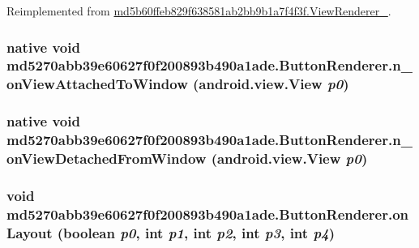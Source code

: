 Reimplemented from \hyperlink{classmd5b60ffeb829f638581ab2bb9b1a7f4f3f_1_1_view_renderer__2_40c528ea52e22dd29fa541de43c0a010}{md5b60ffeb829f638581ab2bb9b1a7f4f3f.ViewRenderer\_}.\hypertarget{classmd5270abb39e60627f0f200893b490a1ade_1_1_button_renderer_aac07254eddcd87b062e694ba6db6bb0}{
\subsubsection[{n\_\-onViewAttachedToWindow}]{\setlength{\rightskip}{0pt plus 5cm}native void md5270abb39e60627f0f200893b490a1ade.ButtonRenderer.n\_\-onViewAttachedToWindow (android.view.View {\em p0})}}
\label{classmd5270abb39e60627f0f200893b490a1ade_1_1_button_renderer_aac07254eddcd87b062e694ba6db6bb0}


\hypertarget{classmd5270abb39e60627f0f200893b490a1ade_1_1_button_renderer_8f2983bfd636ed8d8a82d46e9900e463}{
\subsubsection[{n\_\-onViewDetachedFromWindow}]{\setlength{\rightskip}{0pt plus 5cm}native void md5270abb39e60627f0f200893b490a1ade.ButtonRenderer.n\_\-onViewDetachedFromWindow (android.view.View {\em p0})}}
\label{classmd5270abb39e60627f0f200893b490a1ade_1_1_button_renderer_8f2983bfd636ed8d8a82d46e9900e463}


\hypertarget{classmd5270abb39e60627f0f200893b490a1ade_1_1_button_renderer_f2e3875cd2b7a03f7278f91e55939532}{
\subsubsection[{onLayout}]{\setlength{\rightskip}{0pt plus 5cm}void md5270abb39e60627f0f200893b490a1ade.ButtonRenderer.onLayout (boolean {\em p0}, \/  int {\em p1}, \/  int {\em p2}, \/  int {\em p3}, \/  int {\em p4})}}
\label{classmd5270abb39e60627f0f200893b490a1ade_1_1_button_renderer_f2e3875cd2b7a03f7278f91e55939532}




